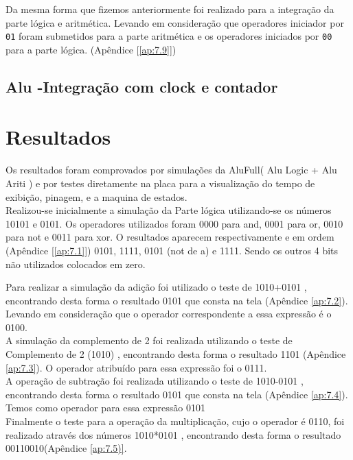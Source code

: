     Da mesma forma que fizemos anteriormente foi realizado para a integração da parte lógica e aritmética. Levando em consideração que operadores iniciador por \texttt{01} foram submetidos para a parte aritmética e os operadores iniciados por \texttt{00} para a parte lógica. (Apêndice [\ref{ap:7.9}])\\
    
    \subsection*{Alu -Integração com clock e contador}
    

\section{Resultados}
 Os resultados foram comprovados por simulações da AluFull( Alu Logic + Alu Ariti ) e por testes diretamente na placa para a visualização do tempo de exibição, pinagem, e a maquina de estados.\\
 
 Realizou-se inicialmente a simulação da Parte lógica utilizando-se os números 10101 e 0101. Os operadores utilizados foram 0000 para and, 0001 para or, 0010 para not e 0011 para xor. O resultados aparecem respectivamente e em ordem (Apêndice [\ref{ap:7.1}]) 0101, 1111, 0101 (not de a) e 1111. Sendo os outros 4 bits não utilizados colocados em zero.

 Para realizar a simulação da adição foi utilizado o teste de 1010+0101 , encontrando desta forma o resultado 0101 que consta na tela (Apêndice \ref{ap:7.2}). Levando em consideração que o operador correspondente a essa expressão é o 0100.\\
 
  A simulação da complemento de 2 foi realizada utilizando o teste de Complemento de 2 (1010) , encontrando desta forma o resultado 1101 (Apêndice \ref{ap:7.3}). O operador atribuído para essa expressão foi o 0111.\\
  
   A operação de subtração foi realizada utilizando o teste de 1010-0101 , encontrando desta forma o resultado 0101 que consta na tela (Apêndice \ref{ap:7.4}). Temos como operador para essa expressão 0101\\
   
    Finalmente o teste para a operação da multiplicação, cujo o operador é 0110, foi realizado através dos números 1010*0101 , encontrando desta forma o resultado 00110010(Apêndice \ref{ap:7.5)}. \\

